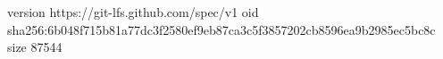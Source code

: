 version https://git-lfs.github.com/spec/v1
oid sha256:6b048f715b81a77dc3f2580ef9eb87ca3c5f3857202cb8596ea9b2985ec5bc8c
size 87544
